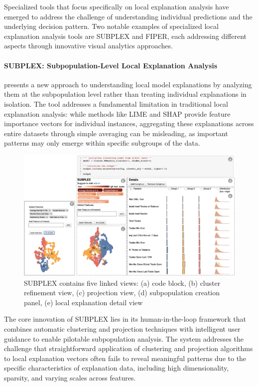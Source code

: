 Specialized tools that focus specifically on local explanation analysis have emerged to address the challenge of understanding individual predictions and the underlying decision pattern. 
Two notable examples of specialized local explanation analysis tools are SUBPLEX and FIPER, each addressing different aspects through innovative visual analytics approaches.

\paragraph{SUBPLEX: Subpopulation-Level Local Explanation Analysis}

\cite{9861728} presents a new approach to understanding local model explanations by analyzing them at the subpopulation level rather than treating individual explanations in isolation. The tool addresses a fundamental limitation in traditional local explanation analysis: while methods like LIME \cite{ribeiro2016should} and SHAP \cite{lundberg2017unified} provide feature importance vectors for individual instances, aggregating these explanations across entire datasets through simple averaging can be misleading, as important patterns may only emerge within specific subgroups of the data.

\begin{figure}
\centering
\includegraphics[width=\textwidth]{images/subplex.png}
\caption{SUBPLEX contains five linked views: (a) code block, (b) cluster refinement view, (c) projection view, (d) subpopulation
creation panel, (e) local explanation detail view}
\label{fig:subplex_interface}
\end{figure}

The core innovation of SUBPLEX lies in its human-in-the-loop framework that combines automatic clustering and projection techniques with intelligent user guidance to enable pilotable subpopulation analysis. 
The system addresses the challenge that straightforward application of clustering and projection algorithms to local explanation vectors often fails to reveal meaningful patterns due to the specific characteristics of explanation data, including high dimensionality, sparsity, and varying scales across features.

